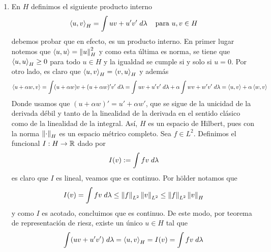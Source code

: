 \documentclass{article}
\begin{document}
\begin{enumerate}
    \item En $H$ definimos el siguiente producto interno
    \begin{equation*}
        \left\langle{u},{v}\right\rangle_{H}=\int uv+u'v'\hspace{1mm}d\lambda
        \hspace{4mm}\text{para }u,v\in H
    \end{equation*}
    debemos probar que en efecto, es un producto interno. En primer lugar notemos que 
    $\left\langle{u},{u}\right\rangle=\left \lVert u\right \rVert_{H}^{2}$ y como esta última es norma, se tiene que $\left\langle{u},{u}\right\rangle_{H}\geq0$ 
    para todo $u\in H$ y la igualdad se cumple si y solo si $u=0$. Por otro lado, es claro que
    $\left\langle{u},{v}\right\rangle_{H}=\left\langle{v},{u}\right\rangle_{H}$ y además
    \begin{equation*}
        \left\langle{u+\alpha w},{v}\right\rangle=\int(u+\alpha w)v+(u+\alpha w)'v'\hspace{1mm}d\lambda
        =\int uv+u'v'\hspace{1mm}d\lambda+\alpha\int wv+w'v'\hspace{1mm}d\lambda
        =\left\langle{u},{v}\right\rangle+\alpha\left\langle{w},{v}\right\rangle
    \end{equation*}
    Donde usamos que $(u+\alpha w)'=u'+\alpha w'$, que se sigue de la unicidad de la derivada 
    débil y tanto de la linealidad de la derivada en el sentido clásico como de la linealidad de 
    la integral. Así, $H$ es un espacio de Hilbert, pues con la norma $\left \lVert \cdot\right \rVert_{H}$ es un 
    espacio métrico completo. Sea $f\in L^{2}$. Definimos el funcional $I:H\to\mathbb{R}$ dado por
    \begin{equation*}
        I(v):=\int fv\hspace{1mm}d\lambda
    \end{equation*}
    es claro que $I$ es lineal, veamos que es continuo. Por hölder notamos que
    \begin{equation*}
        I(v)=\int fv\hspace{1mm}d\lambda\leq\left \lVert f\right \rVert_{L^{2}}\left \lVert v\right \rVert_{L^{2}}
        \leq\left \lVert f\right \rVert_{L^{2}}\left \lVert v\right \rVert_{H}
    \end{equation*}
    y como $I$ es acotado, concluimos que es continuo. De este modo, por teorema de representación
    de riesz, existe un único $u\in H$ tal que
    \begin{equation*}
        \int (uv+u'v')\hspace{1mm}d\lambda=\left\langle{u},{v}\right\rangle_{H}=I(v)=\int fv\hspace{1mm}d\lambda
    \end{equation*}
\end{enumerate}

\end{document}
